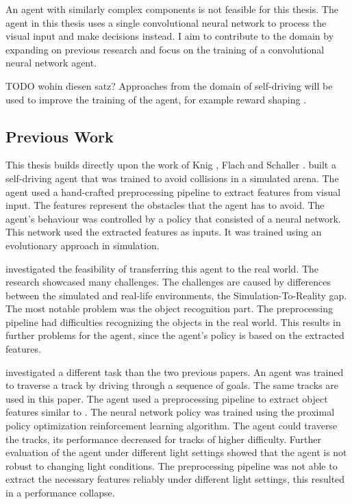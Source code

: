 An agent with similarly complex components is not feasible for this thesis. The agent in this thesis uses a single convolutional neural network to process the visual input and make decisions instead. I aim to contribute to the domain by expanding on previous research and focus on the training of a convolutional neural network agent. 


TODO wohin diesen satz?
Approaches from the domain of self-driving will be used to improve the training of the agent, for example reward shaping \autocite{drl_for_ad}.

\subsection{Previous Work}
This thesis builds directly upon the work of Knig \autocite{jonas_koenig}, Flach \autocite{merlin_flach} and Schaller \autocite{maximilian}. 
\autocite{jonas_koenig} built a self-driving agent that was trained to avoid collisions in a simulated arena. The agent used a hand-crafted preprocessing pipeline to extract features from visual input. The features represent the obstacles that the agent has to avoid. The agent's behaviour was controlled by a policy that consisted of a neural network. This network used the extracted features as inputs. It was trained using an evolutionary approach in simulation.

\autocite{merlin_flach} investigated the feasibility of transferring this agent to the real world. The research showcased many challenges. The challenges are caused by differences between the simulated and real-life environments, the Simulation-To-Reality gap. The most notable problem was the object recognition part. The preprocessing pipeline had difficulties recognizing the objects in the real world. This results in further problems for the agent, since the agent's policy is based on the extracted features.

\autocite{maximilian} investigated a different task than the two previous papers. An agent was trained to traverse a track by driving through a sequence of goals. The same tracks are used in this paper. The agent used a preprocessing pipeline to extract object features similar to \autocite{jonas_koenig}. The neural network policy was trained using the proximal policy optimization \autocite{ppo} reinforcement learning algorithm. The agent could traverse the tracks, its performance decreased for tracks of higher difficulty. Further evaluation of the agent under different light settings showed that the agent is not robust to changing light conditions. The preprocessing pipeline was not able to extract the necessary features reliably under different light settings, this resulted in a performance collapse.

